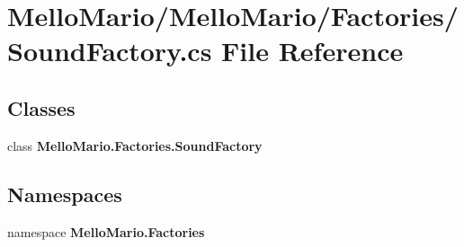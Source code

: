 \section{Mello\+Mario/\+Mello\+Mario/\+Factories/\+Sound\+Factory.cs File Reference}
\label{SoundFactory_8cs}
\subsection*{Classes}
\begin{DoxyCompactItemize}
\item 
class \textbf{ Mello\+Mario.\+Factories.\+Sound\+Factory}
\end{DoxyCompactItemize}
\subsection*{Namespaces}
\begin{DoxyCompactItemize}
\item 
namespace \textbf{ Mello\+Mario.\+Factories}
\end{DoxyCompactItemize}
